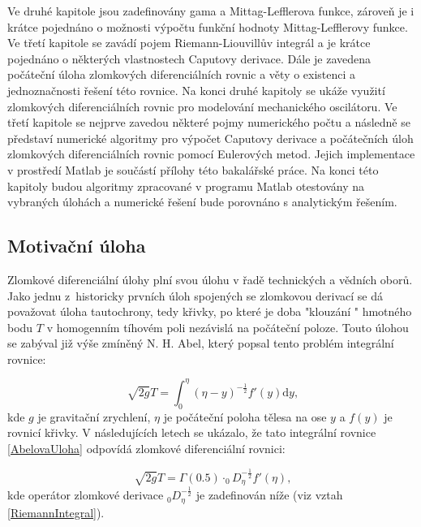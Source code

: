 \documentclass[a4paper,12pt,twoside]{article}
\theoremstyle{definition}
\theoremstyle{remark}
\numberwithin{equation}{section}
\numberwithin{table}{section}
\numberwithin{figure}{section}
\newcommand{\dx}[1]{\mathrm{d} #1}
\begin{document}
Ve druhé kapitole jsou zadefinovány gama a Mittag-Lefflerova funkce, zároveň je i krátce pojednáno o možnosti výpočtu funkční hodnoty Mittag-Lefflerovy funkce. Ve třetí kapitole se zavádí pojem Riemann-Liouvillův integrál a je krátce pojednáno o některých vlastnostech Caputovy derivace. Dále je zavedena počáteční úloha zlomkových diferenciálních rovnic a věty o existenci a jednoznačnosti řešení této rovnice. Na konci druhé kapitoly se ukáže využití zlomkových diferenciálních rovnic pro modelování mechanického oscilátoru. 
Ve třetí kapitole se nejprve zavedou některé pojmy numerického počtu a následně se představí numerické algoritmy pro výpočet Caputovy derivace a počátečních úloh zlomkových diferenciálních rovnic pomocí Eulerových metod. Jejich implementace v prostředí Matlab je součástí přílohy této bakalářské práce. Na konci této kapitoly budou algoritmy zpracované v programu Matlab otestovány na vybraných úlohách a numerické řešení bude porovnáno s analytickým řešením.

\subsection{Motivační úloha} 
Zlomkové diferenciální úlohy plní svou úlohu v řadě technických a vědních oborů. Jako jednu z~historicky prvních úloh spojených se zlomkovou derivací se dá považovat úloha tautochrony, tedy křivky, po které je doba "klouzání " hmotného bodu $ T$ v homogenním tíhovém poli nezávislá na počáteční poloze. Touto úlohou se zabýval již výše zmíněný N. H. Abel, který popsal tento problém integrální rovnice:

\begin{equation} \label{AbelovaUloha}
		\sqrt[]{2g}T = \int_{0}^{\eta } \left( \eta - y\right) ^{-\frac{1}{2}} f'\left( y\right) \dx{y},
\end{equation}
kde $g$ je gravitační zrychlení, $\eta$ je počáteční poloha tělesa na ose $y$ a $f\left(y\right) $ je  rovnicí křivky.
V následujících letech se ukázalo, že tato integrální rovnice \eqref{AbelovaUloha} odpovídá zlomkové diferenciální rovnici:

$$
	\sqrt[]{2g}T = \Gamma\left( 0.5 \right) \cdot _{0}\!D_{\eta}^{-\frac{1}{2}} f'\left( \eta \right), 
$$
kde operátor zlomkové derivace $_{0}\!D_{\eta}^{-\frac{1}{2}}$ je zadefinován níže (viz vztah  \eqref{RiemannIntegral}).

\newpage
\end{document}
